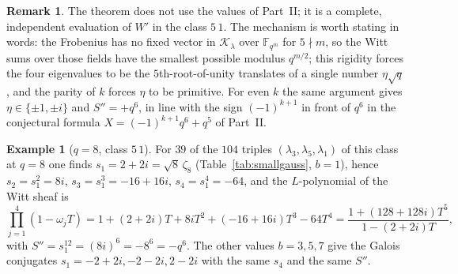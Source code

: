 ﻿\documentclass[12pt,a4paper]{amsart}
\theoremstyle{definition}
\newtheorem{remark}[theorem]{Remark}
\newtheorem{example}[theorem]{Example}
\newcommand{\F}{\mathbb{F}}
\newcommand{\Kk}{\mathcal{K}}
\newcommand{\Spp}{S''}
\begin{document}
\begin{remark}
The theorem does not use the values of Part~II; it is a complete, independent evaluation of $W'$ in the class $5\,1$. The mechanism is worth stating in words: the Frobenius has no fixed vector in $\Kk_\lambda$ over $\F_{q^m}$ for $5\nmid m$, so the Witt sums over those fields have the smallest possible modulus $q^{m/2}$; this rigidity forces the four eigenvalues to be the $5$th-root-of-unity translates of a single number $\eta\sqrt q$, and the parity of $k$ forces $\eta$ to be primitive. For even $k$ the same argument gives $\eta\in\{\pm1,\pm i\}$ and $\Spp=+q^6$, in line with the sign $(-1)^{k+1}$ in front of $q^6$ in the conjectural formula $X=(-1)^{k+1}q^6+q^5$ of Part~II.
\end{remark}

\begin{example}[$q=8$, class $5\,1$]
For $39$ of the $104$ triples $(\lambda_3,\lambda_5,\lambda_1)$ of this class at $q=8$ one finds $s_1=2+2i=\sqrt8\,\zeta_8$ (Table~\ref{tab:smallgauss}, $b=1$), hence $s_2=s_1^2=8i$, $s_3=s_1^3=-16+16i$, $s_4=s_1^4=-64$, and the $L$-polynomial of the Witt sheaf is
\[
\prod_{j=1}^4(1-\omega_jT)=1+(2+2i)T+8iT^2+(-16+16i)T^3-64T^4=\frac{1+(128+128i)T^5}{1-(2+2i)T},
\]
with $\Spp=s_1^{12}=(8i)^6=-8^6=-q^6$. The other values $b=3,5,7$ give the Galois conjugates $s_1=-2+2i,-2-2i,2-2i$ with the same $s_4$ and the same $\Spp$.
\end{example}
\end{document}
